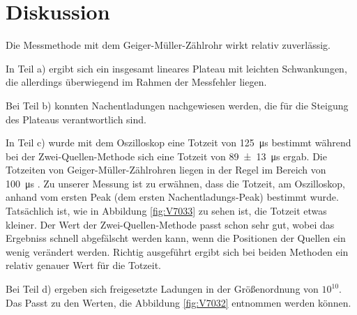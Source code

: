 \documentclass[
  bibliography=totoc,     %
  captions=tableheading,  %
  titlepage=firstiscover, %
]{scrartcl}
\begin{document}
\section{Diskussion}
\label{sec:diskussion}
Die Messmethode mit dem Geiger-Müller-Zählrohr wirkt relativ zuverlässig.

In Teil a) ergibt sich ein insgesamt lineares Plateau mit leichten Schwankungen,
die allerdings überwiegend im Rahmen der Messfehler liegen.

Bei Teil b) konnten Nachentladungen nachgewiesen werden, die für die Steigung
des Plateaus verantwortlich sind.

In Teil c) wurde mit dem Oszilloskop eine Totzeit von \SI{125}{\micro\second} bestimmt
während bei der Zwei-Quellen-Methode sich eine Totzeit von \SI{89(13)}{\micro\second}
ergab. Die Totzeiten von Geiger-Müller-Zählrohren liegen in der Regel im Bereich
von \SI{100}{\micro\second} \cite{geigerwiki}.
Zu unserer Messung ist zu erwähnen, dass die Totzeit, am Oszilloskop, anhand vom ersten
Peak (dem ersten Nachentladungs-Peak) bestimmt wurde. Tatsächlich ist, wie in Abbildung
\ref{fig:V7033} zu sehen ist, die Totzeit etwas kleiner. Der Wert der Zwei-Quellen-Methode
passt schon sehr gut, wobei das Ergebniss schnell abgefälscht werden kann, wenn die
Positionen der Quellen ein wenig verändert werden.
Richtig ausgeführt ergibt sich bei beiden Methoden ein relativ genauer Wert für
die Totzeit.

Bei Teil d) ergeben sich freigesetzte Ladungen in der Größenordnung von $10^{10}$.
Das Passt zu den Werten, die Abbildung \ref{fig:V7032} entnommen werden können.
\nocite{*}
\printbibliography
\end{document}
